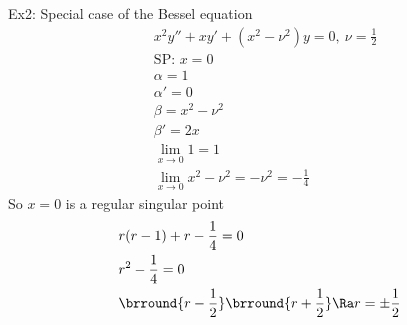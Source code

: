 Ex2: Special case of the Bessel equation
\begin{align*}
    &x^2y''+xy'+(x^2-\nu^2)y=0,\ \nu=\frac{1}{2}\\
    &\text{SP: }x=0\\
    &\alpha=1\\
    &\alpha'=0\\
    &\beta=x^2-\nu^2\\
    &\beta'=2x\\
    &\lim_{x\to0}1=1\\
    &\lim_{x\to0}x^2-\nu^2=-\nu^2=-\frac{1}{4}
\end{align*}
So $x=0$ is a regular singular point
\begin{align*}
    &r(r-1)+r-\frac{1}{4}=0\\
    &r^2-\frac{1}{4}=0\\
    &\brround{r-\frac{1}{2}}\brround{r+\frac{1}{2}}\Ra r=\pm\frac{1}{2}
\end{align*}
